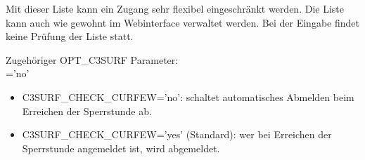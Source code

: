 \begin{description}
  Mit dieser Liste kann ein Zugang sehr flexibel eingeschränkt werden. Die Liste kann auch wie gewohnt im
  Webinterface verwaltet werden. Bei der Eingabe findet keine Prüfung der Liste statt. 
   
  Zugehöriger OPT\_C3SURF Parameter:\\
  ='no'
    \begin{itemize}
        \item{C3SURF\_CHECK\_CURFEW='no'}: schaltet automatisches Abmelden beim Erreichen der Sperrstunde ab.
        \item{C3SURF\_CHECK\_CURFEW='yes'} (Standard): wer bei Erreichen der Sperrstunde angemeldet ist, wird abgemeldet.
    \end{itemize}
\end{description}
